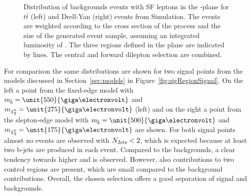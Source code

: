 \begin{figure}[htbp]
\begin{minipage}[t]{0.49\textwidth}
\end{minipage}
\caption{Distribution of backgrounds events with SF leptons in the \MET-\njets plane for $t\bar{t}$ (left) and Drell-Yan (right) events from Simulation. The events are weighted according to the cross section of the process and the size of the generated event sample, assuming an integrated luminosity of \lumi. The three regions defined in the plane are indicated by lines. The central and forward dilepton selection are combined.}
\label{fig:sigRegionBG}
\end{figure}  
  
For comparison the same distributions are shown for two signal points from the models discussed in Section~\ref{sec:models} in Figure~\ref{fig:sigRegionSignal}. On the left a point from the fixed-edge model with $m_{\sbottom} = \unit{550}{\giga\electronvolt}$ and $m_{\secondchi} = \unit{275}{\giga\electronvolt}$ (left) and on the right a point from the slepton-edge model with $m_{\sbottom} = \unit{500}{\giga\electronvolt}$ and $m_{\secondchi} = \unit{175}{\giga\electronvolt}$ are shown. For both signal points almost no events are observed with $N_\text{Jets} < 2$, which is expected because at least two b-jets are produced in each event. Compared to the backgrounds, a clear tendency towards higher \MET and \njets is observed. However, also contributions to two control regions are present, which are small compared to the background contributions. Overall, the chosen selection offers a good separation of signal and backgrounds.

